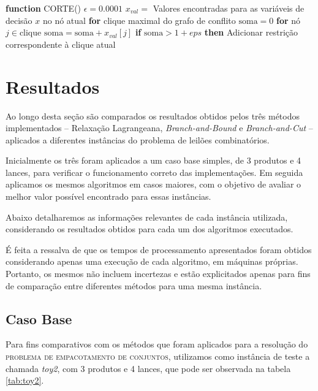 \documentclass{article}
\newenvironment{algoritmo}[1][]
  {\begin{algorithm}[#1]
     \selectlanguage{brazil}%
     \floatname{algorithm}{Algoritmo}%
  }
  {\end{algorithm}}
\begin{document}
	\begin{algoritmo}[h]
        \begin{algorithmic}[1] 
            \Statex
            \State \textbf{function}\textsc{ CORTE}()
            \State \indent $\epsilon = 0.0001$
            \State \indent $x_{val} = $ Valores encontradas para as variáveis de decisão $x$ no nó atual
            \State \indent \textbf{for}{ clique maximal do grafo de conflito}
            \State \indent \indent $ \text{soma} = 0 $
            \State \indent \indent \textbf{for}{ nó $j \in \text{clique}$}
            \State \indent \indent \indent $ \text{soma} = \text{soma} + x_{val}[j] $
            \State \indent \indent \textbf{if}{ $ \text{soma} > 1 + eps $ }\textbf{then}
            \State \indent \indent {}
            \State \indent \indent \indent Adicionar restrição correspondente à clique atual
        \end{algorithmic}
    \end{algoritmo}

	\section{Resultados}\label{sec:res}

	Ao longo desta seção são comparados os resultados obtidos pelos três métodos implementados -- Relaxação Lagrangeana, \emph{Branch-and-Bound} e \emph{Branch-and-Cut} -- aplicados a diferentes instâncias do problema de leilões combinatórios.
	
	Inicialmente os três foram aplicados a um caso base simples, de 3 produtos e 4 lances, para verificar o funcionamento correto das implementações. Em seguida aplicamos os mesmos algoritmos em casos maiores, com o objetivo de avaliar o melhor valor possível encontrado para essas instâncias. 
	
	Abaixo detalharemos as informações relevantes de cada instância utilizada, considerando os resultados obtidos para cada um dos algoritmos executados.
	
	É feita a ressalva de que os tempos de processamento apresentados foram obtidos considerando apenas uma execução de cada algoritmo, em máquinas próprias. Portanto, os mesmos não incluem incertezas e estão explicitados apenas para fins de comparação entre diferentes métodos para uma mesma instância.
	
		\subsection{Caso Base} \label{sec:caso}
	    Para fins comparativos com os métodos que foram aplicados para a resolução do \textsc{problema de empacotamento de conjuntos}, utilizamos como instância de teste a chamada \textit{toy2}, com 3 produtos e 4 lances, que pode ser observada na tabela \ref{tab:toy2}.
	    
\end{document}
